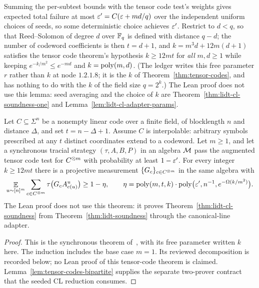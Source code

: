 \begin{lemma}
\label{lem:lidt-derandomize}
Summing the per-subtest bounds with the tensor code test's weights gives expected total failure
at most $\eps' = C(\eps + md/q)$ over the independent uniform choices of seeds, so some
deterministic choice achieves $\eps'$. Restrict to $d < q$, so that Reed--Solomon of degree $d$
over $\F_q$ is defined with distance $q - d$; the number of codeword coefficients is then
$t = d + 1$, and $k = m^3 d + 12m(d+1)$ satisfies the tensor code theorem's
hypothesis $k \geq 12mt$ for \emph{all} $m, d \geq 1$ while keeping $e^{-k/m^2} \leq e^{-md}$ and
$k = \poly(m, d)$. (The ledger writes this free parameter $r$ rather than $k$ at node
$1.2.1.8$; it is the $k$ of Theorem~\ref{thm:tensor-codes}, and has nothing to do with the $k$
of the field size $q = 2^k$.)
The Lean proof does not use this lemma: seed averaging and the choice of $k$ are
Theorem~\ref{thm:lidt-cl-soundness-one} and Lemma~\ref{lem:lidt-cl-adapter-params}.
\end{lemma}

\effortHard

\begin{theorem}
\label{thm:tensor-codes}
Let $C\subseteq\Sigma^n$ be a nonempty linear code over a finite field, of blocklength
$n$ and distance $\Delta$, and set $t=n-\Delta+1$. Assume $C$ is interpolable:
arbitrary symbols prescribed at any $t$ distinct coordinates extend to a codeword.
Let $m\geq1$, and let a synchronous tracial strategy $(\tau,A,B,P)$ in an algebra
$\cal M$ pass the augmented tensor code test for $C^{\ot m}$ with probability at
least $1-\eps'$. For every integer $k\geq12mt$ there is a projective measurement
$\{G_c\}_{c\in C^{\ot m}}$ in the same algebra with
\[
  \E_{u\sim[n]^m}\sum_{c\in C^{\ot m}}\tau\bigl(G_c A^u_{c(u)}\bigr)
  \geq 1-\eta,\qquad
  \eta=\poly(m,t,k)\cdot\poly\bigl(\eps',n^{-1},e^{-\Omega(k/m^2)}\bigr).
\]
The Lean proof does not use this theorem: it proves Theorem~\ref{thm:lidt-cl-soundness} from
Theorem~\ref{thm:lidt-soundness} through the canonical-line adapter.
\end{theorem}

\begin{proof}
This is the synchronous theorem of~\cite{JNVWY21tensor}, with its free parameter
written $k$ here. The induction includes the base case $m=1$. Its reviewed
decomposition is recorded below; no Lean proof of this tensor-code theorem is
claimed. Lemma~\ref{lem:tensor-codes-bipartite} supplies the separate two-prover
contract that the seeded CL reduction consumes.
\end{proof}

